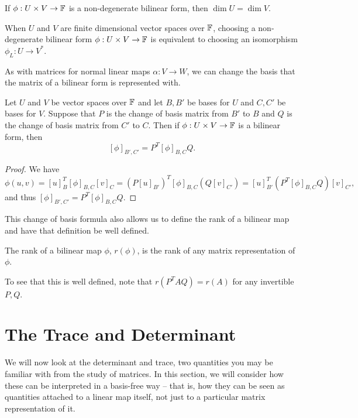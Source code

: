 \documentclass[a4paper]{scrartcl}
\begin{document}
\begin{corollary}
    If $\phi: U \times V \rightarrow \mathbb{F}$ is a non-degenerate bilinear form, then $\dim U = \dim V$.
\end{corollary}

\begin{corollary}
    When $U$ and $V$ are finite dimensional vector spaces over $\mathbb{F}$, choosing a non-degenerate bilinear form $\phi: U \times V \rightarrow \mathbb{F}$ is equivalent to choosing an isomorphism $\phi_L : U \rightarrow V^*$.
\end{corollary}

As with matrices for normal linear maps $\alpha: V \rightarrow W$, we can change the basis that the matrix of a bilinear form is represented with.

\begin{proposition}
    Let $U$ and $V$ be vector spaces over $\mathbb{F}$ and let $B, B'$ be bases for $U$ and $C, C'$ be bases for $V$. Suppose that $P$ is the change of basis matrix from $B'$ to $B$ and $Q$ is the change of basis matrix from $C'$ to $C$. Then if $\phi: U \times V \rightarrow \mathbb{F}$ is a bilinear form, then
    $$
    [\phi]_{B', C'} = P^T [\phi]_{B, C} Q.
    $$
\end{proposition}
\begin{proof}
    We have
    $$
        \phi(u, v) = [u]^T_B [\phi]_{B, C} [v]_C 
            = (P[u]_{B'})^T [\phi]_{B, C} (Q [v]_{C'}) 
                = [u]^T_{B'} (P^T [\phi]_{B, C} Q) [v]_{C'},
    $$
    and thus $[\phi]_{B', C'} = P^T [\phi]_{B, C} Q$.
\end{proof}

This change of basis formula also allows us to define the rank of a bilinear map and have that definition be well defined.

\begin{definition}
    The rank of a bilinear map $\phi$, $r(\phi)$, is the rank of any matrix representation of $\phi$. 
\end{definition}

To see that this is well defined, note that $r(P^T AQ) = r(A)$ for any invertible $P, Q$.

\section{The Trace and Determinant}

We will now look at the determinant and trace, two quantities you may be familiar with from the study of matrices. In this section, we will consider how these can be interpreted in a basis-free way -- that is, how they can be seen as quantities attached to a linear map itself, not just to a particular matrix representation of it.
\end{document}

